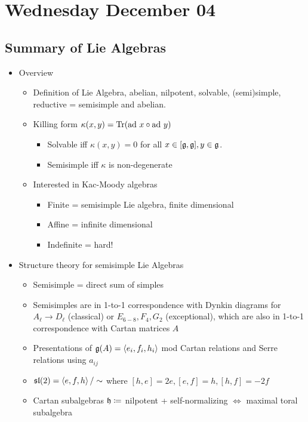 \hypertarget{wednesday-december-04}{%
\section{Wednesday December 04}\label{wednesday-december-04}}

\hypertarget{summary-of-lie-algebras}{%
\subsection{Summary of Lie Algebras}\label{summary-of-lie-algebras}}

\begin{itemize}
\tightlist
\item
  Overview

  \begin{itemize}
  \tightlist
  \item
    Definition of Lie Algebra, abelian, nilpotent, solvable,
    (semi)simple, reductive = semisimple and abelian.
  \item
    Killing form \(\kappa(x, y) = \mathrm{Tr}(\mathrm{ad}~ x \circ \mathrm{ad}~ y)\)

    \begin{itemize}
    \tightlist
    \item
      Solvable iff \(\kappa(x, y) = 0\) for all
      \(x\in [{\mathfrak{g}}, {\mathfrak{g}}], y\in {\mathfrak{g}}\).
    \item
      Semisimple iff \(\kappa\) is non-degenerate
    \end{itemize}
  \item
    Interested in Kac-Moody algebras

    \begin{itemize}
    \tightlist
    \item
      Finite = semisimple Lie algebra, finite dimensional
    \item
      Affine = infinite dimensional
    \item
      Indefinite = hard!
    \end{itemize}
  \end{itemize}
\item
  Structure theory for semisimple Lie Algebras

  \begin{itemize}
  \tightlist
  \item
    Semisimple = direct sum of simples
  \item
    Semisimples are in 1-to-1 correspondence with Dynkin diagrams for
    \(A_\ell \to D_\ell\) (classical) or \(E_{6-8}, F_4 ,G_2\)
    (exceptional), which are also in 1-to-1 correspondence with Cartan
    matrices \(A\)
  \item
    Presentations of \({\mathfrak{g}}(A) = \left\langle{e_i, f_i, h_i}\right\rangle\) mod
    Cartan relations and Serre relations using \(a_{ij}\)
  \item
    \({\mathfrak{sl}}(2) = \left\langle{e,f,h}\right\rangle/\sim\) where
    \([h, e] = 2e, [e,f] = h, [h, f] = -2f\)
  \item
    Cartan subalgebras \({\mathfrak{h}} \coloneqq\) nilpotent + self-normalizing
    \(\iff\) maximal toral subalgebra


\end{itemize}
\end{itemize}

